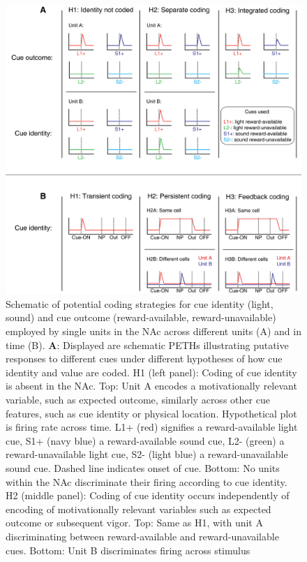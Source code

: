 \documentclass[11pt]{article}
\newcommand{\bsf}[1]{\textbf{#1}}
\begin{document}
\begin{figure}[h]
\centering
\includegraphics[height=0.5\textheight]{Fig 1 - Schematic neural.png}
\caption{Schematic of potential coding strategies for cue identity
  (light, sound) and cue outcome (reward-available,
  reward-unavailable) employed by single units in the NAc across
  different units (A) and in time (B). \bsf{A}: Displayed are
  schematic PETHs illustrating putative responses to different cues
  under different hypotheses of how cue identity and value are
  coded. H1 (left panel): Coding of cue identity is absent in the
  NAc. Top: Unit A encodes a motivationally relevant variable, such as
  expected outcome, similarly across other cue features, such as cue
  identity or physical location. Hypothetical plot is firing rate
  across time. L1+ (red) signifies a reward-available light cue, S1+
  (navy blue) a reward-available sound cue, L2- (green) a
  reward-unavailable light cue, S2- (light blue) a reward-unavailable
  sound cue. Dashed line indicates onset of cue. Bottom: No units
  within the NAc discriminate their firing according to cue
  identity. H2 (middle panel): Coding of cue identity occurs
  independently of encoding of motivationally relevant variables such
  as expected outcome or subsequent vigor. Top: Same as H1, with unit
  A discriminating between reward-available and reward-unavailable
  cues. Bottom: Unit B discriminates firing across stimulus
}
\end{figure}
\end{document}

